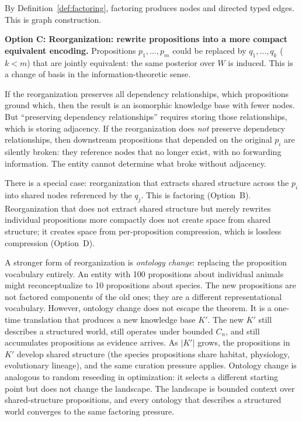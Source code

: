 \documentclass[11pt]{article}
\theoremstyle{definition}
\begin{document}
By Definition~\ref{def:factoring}, factoring produces nodes and directed
typed edges. This is graph construction.

\textbf{Option C: Reorganization: rewrite propositions into a more
compact equivalent encoding.}
Propositions $p_1, \ldots, p_m$ could be replaced by $q_1, \ldots, q_k$
($k < m$) that are jointly equivalent: the same posterior over $W$ is
induced. This is a change of basis in the information-theoretic sense.

If the reorganization preserves all dependency relationships,
which propositions ground which, then the result is an isomorphic
knowledge base with fewer nodes. But ``preserving dependency
relationships'' requires storing those relationships, which is storing
adjacency. If the reorganization does \emph{not} preserve dependency
relationships, then downstream propositions that depended on the
original $p_i$ are silently broken: they reference nodes that no longer
exist, with no forwarding information. The entity cannot determine what
broke without adjacency.

There is a special case: reorganization that extracts shared structure
across the $p_i$ into shared nodes referenced by the $q_j$. This is
factoring (Option~B). Reorganization that does not extract shared
structure but merely rewrites individual propositions more compactly
does not create space from shared structure; it creates space from
per-proposition compression, which is lossless compression (Option~D).

A stronger form of reorganization is \emph{ontology change}: replacing
the proposition vocabulary entirely. An entity with 100 propositions
about individual animals might reconceptualize to 10 propositions about
species. The new propositions are not factored components of the old
ones; they are a different representational vocabulary. However,
ontology change does not escape the theorem. It is a one-time
translation that produces a new knowledge base $K'$. The new $K'$
still describes a structured world, still operates under bounded
$C_n$, and still accumulates propositions as evidence arrives. As
$|K'|$ grows, the propositions in $K'$ develop shared structure (the
species propositions share habitat, physiology, evolutionary
lineage), and the same curation pressure applies. Ontology change is
analogous to random reseeding in optimization: it selects a different
starting point but does not change the landscape. The landscape is
bounded context over shared-structure propositions, and every
ontology that describes a structured world converges to the same
factoring pressure.
\end{document}
